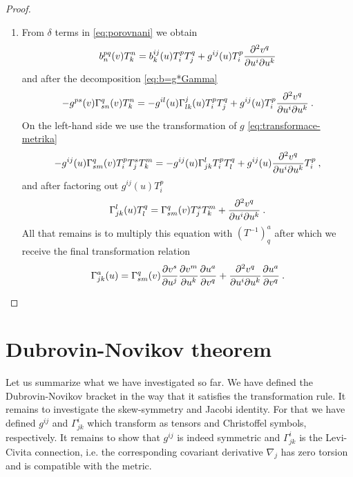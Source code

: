 \begin{proof}
\begin{enumerate}
        \item From $\delta$ terms in \eqref{eq:porovnani} we obtain
        \begin{align}
            b^{pq}_n(v) T^n_k =
            b^{ij}_k(u) T^p_i T^q_j + g^{ij}(u) T^p_i \frac{\partial^2 v^q}{\partial u^i \partial u^k}
        \end{align}
        and after the decomposition \eqref{eq:b=g*Gamma}
        \begin{align}
            - g^{ps}(v) \Gamma^{q}_{sn}(v) T^n_k =
            - g^{il}(u) \Gamma^j_{lk}(u) T^p_i T^q_j + g^{ij}(u) T^p_i \frac{\partial^2 v^q}{\partial u^i \partial u^k} \:.
        \end{align}
        On the left-hand side we use the transformation of $g$ \eqref{eq:transformace-metrika}
        \begin{align}
            -g^{ij}(u) \Gamma^q_{sm}(v) T^p_i T^s_j T^m_k = - g^{ij}(u) \Gamma^l_{jk} T^p_i T^q_l + g^{ij}(u) \frac{\partial^2 v^q}{\partial u^i \partial u^k} T^p_i \:,
        \end{align}
        and after factoring out $g^{ij}(u) T^p_i$
        \begin{align}
            \Gamma^l_{jk}(u) T^q_l = \Gamma^q_{sm}(v) T^s_j T^m_k + \frac{\partial^2 v^q}{\partial u^i \partial u^k} \:.
        \end{align}
        All that remains is to multiply this equation with $(T^{-1})^a_q$ after which we receive the final transformation relation
        \begin{align}
            \Gamma^a_{jk}(u) = \Gamma^q_{sm}(v) \frac{\partial v^s}{\partial u^j} \frac{\partial v^m}{\partial u^k} \frac{\partial u^a}{\partial v^q} + \frac{\partial^2 v^q}{\partial u^i \partial u^k} \frac{\partial u^a}{\partial v^q} \:.
        \end{align}
    \end{enumerate}
\end{proof}



\section{Dubrovin-Novikov theorem}

Let us summarize what we have investigated so far. We have defined the Dubrovin-Novikov bracket in the way that it satisfies the transformation rule. It remains to investigate the skew-symmetry and Jacobi identity. For that we have defined $g^{ij}$ and $\Gamma^i_{jk}$ which transform as tensors and Christoffel symbols, respectively. It remains to show that $g^{ij}$ is indeed symmetric and $\Gamma^i_{jk}$ is the Levi-Civita connection, i.e. the corresponding covariant derivative $\nabla_j$ has zero torsion and is compatible with the metric.


